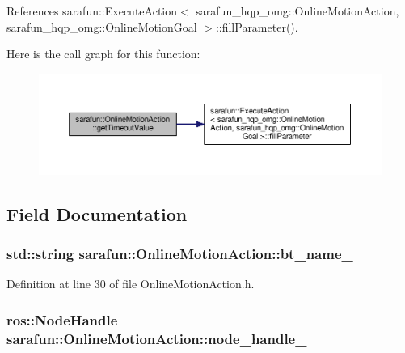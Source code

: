 References sarafun\-::\-Execute\-Action$<$ sarafun\-\_\-hqp\-\_\-omg\-::\-Online\-Motion\-Action, sarafun\-\_\-hqp\-\_\-omg\-::\-Online\-Motion\-Goal $>$\-::fill\-Parameter().



Here is the call graph for this function\-:\nopagebreak
\begin{figure}[H]
\begin{center}
\leavevmode
\includegraphics[width=350pt]{d0/d3c/classsarafun_1_1OnlineMotionAction_a453e7dca41a0d73b5297ce191e760b31_a453e7dca41a0d73b5297ce191e760b31_cgraph}
\end{center}
\end{figure}




\subsection{Field Documentation}
\hypertarget{classsarafun_1_1OnlineMotionAction_aa82a73fea4355036ae0faa473608e5bb_aa82a73fea4355036ae0faa473608e5bb}{
\subsubsection[{bt\-\_\-name\-\_\-}]{\setlength{\rightskip}{0pt plus 5cm}std\-::string sarafun\-::\-Online\-Motion\-Action\-::bt\-\_\-name\-\_\-\hspace{0.3cm}{\ttfamily [private]}}}\label{classsarafun_1_1OnlineMotionAction_aa82a73fea4355036ae0faa473608e5bb_aa82a73fea4355036ae0faa473608e5bb}


Definition at line 30 of file Online\-Motion\-Action.\-h.

\hypertarget{classsarafun_1_1OnlineMotionAction_af14d66bb4bd818b4847f76b0f85eb35b_af14d66bb4bd818b4847f76b0f85eb35b}{
\subsubsection[{node\-\_\-handle\-\_\-}]{\setlength{\rightskip}{0pt plus 5cm}ros\-::\-Node\-Handle sarafun\-::\-Online\-Motion\-Action\-::node\-\_\-handle\-\_\-\hspace{0.3cm}{\ttfamily [private]}}}\label{classsarafun_1_1OnlineMotionAction_af14d66bb4bd818b4847f76b0f85eb35b_af14d66bb4bd818b4847f76b0f85eb35b}


